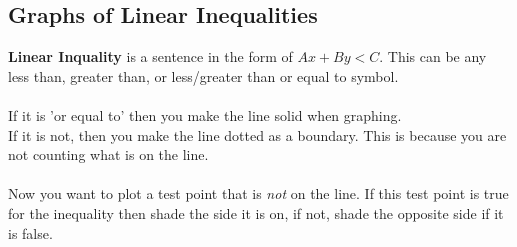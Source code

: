 \subsection{Graphs of Linear Inequalities}
\textbf{Linear Inquality} is a sentence in the form of $Ax + By < C$. This can be any less than, greater than, or less/greater than or equal to symbol.
\\\\
If it is 'or equal to' then you make the line solid when graphing.\\ If it is not, then you make the line dotted as a boundary. This is because you are not counting what is on the line. 
\\\\
Now you want to plot a test point that is \textit{not} on the line. If this test point is true for the inequality then shade the side it is on, if not, shade the opposite side if it is false.
